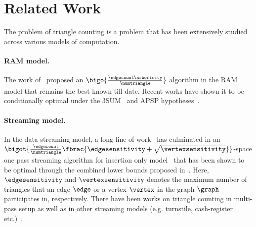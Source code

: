 \section{Related Work}
\label{ssec:related work}
The problem of triangle counting is a problem that has been extensively studied across various models of computation. 
\paragraph{RAM model.}
The work of~\citep{DBLP:journals/siamcomp/ChibaN85} proposed an $\bigo{\frac{\edgecount\arboricity}{\numtriangle}}$ algorithm in the RAM model that remains the best known till date. Recent works  have shown it to be conditionally optimal under the 3SUM~\citep{DBLP:conf/soda/KopelowitzPP16} and APSP hypotheses~\citep{DBLP:conf/focs/WilliamsX20}. 
\paragraph{Streaming model.}
In the data streaming model, a long line of work~\citep{DBLP:journals/ipl/PaghT12,DBLP:journals/pvldb/PavanTTW13} has culminated in an $\bigot{\frac{\edgecount}{\numtriangle}\fbrac{\edgesensitivity+\sqrt{\vertexsensitivity}}}$-space one pass streaming algorithm for insertion only model~\citep{KallaugherP17} that has been shown to be optimal through the combined lower bounds proposed in~\citep{BOV_13_Streaming_triangle_counting_hardness,KallaugherP17}. Here,  $\edgesensitivity$ and $\vertexsensitivity$  denotes the maximum number of triangles that an edge $\edge$ or a vertex $\vertex$ in the graph $\graph$ participates in, respectively. There have been works on triangle counting in multi-pass setup as well as in other streaming models (e.g. turnstile, cash-register etc.)~\citep{DBLP:conf/pods/McGregorVV16,DBLP:conf/stacs/BeraC17}.

